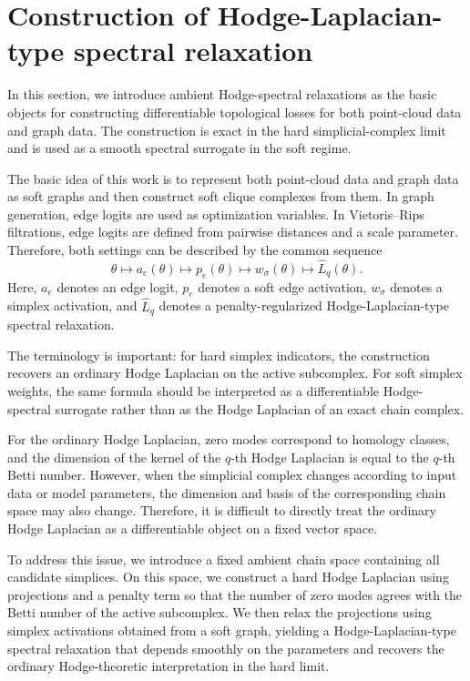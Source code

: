 \documentclass[pdflatex,sn-mathphys-ay]{sn-jnl}%
\theoremstyle{thmstyleone}%
\theoremstyle{thmstyletwo}%
\theoremstyle{thmstylethree}%
\begin{document}
\section{Construction of Hodge-Laplacian-type spectral relaxation}

In this section, we introduce ambient Hodge-spectral relaxations as the basic objects for constructing differentiable topological losses for both point-cloud data and graph data.
The construction is exact in the hard simplicial-complex limit and is used as a smooth spectral surrogate in the soft regime.

The basic idea of this work is to represent both point-cloud data and graph data as soft graphs and then construct soft clique complexes from them. In graph generation, edge logits are used as optimization variables. In Vietoris--Rips filtrations, edge logits are defined from pairwise distances and a scale parameter. Therefore, both settings can be described by the common sequence
\[
\theta
\longmapsto
a_e(\theta)
\longmapsto
p_e(\theta)
\longmapsto
w_\sigma(\theta)
\longmapsto
\widehat{L}_q(\theta).
\]
Here, \(a_e\) denotes an edge logit, \(p_e\) denotes a soft edge activation, \(w_\sigma\) denotes a simplex activation, and \(\widehat{L}_q\) denotes a penalty-regularized Hodge-Laplacian-type spectral relaxation.

The terminology is important: for hard simplex indicators, the construction recovers an ordinary Hodge Laplacian on the active subcomplex. For soft simplex weights, the same formula should be interpreted as a differentiable Hodge-spectral surrogate rather than as the Hodge Laplacian of an exact chain complex.

For the ordinary Hodge Laplacian, zero modes correspond to homology classes, and the dimension of the kernel of the \(q\)-th Hodge Laplacian is equal to the \(q\)-th Betti number. However, when the simplicial complex changes according to input data or model parameters, the dimension and basis of the corresponding chain space may also change. Therefore, it is difficult to directly treat the ordinary Hodge Laplacian as a differentiable object on a fixed vector space.

To address this issue, we introduce a fixed ambient chain space containing all candidate simplices. On this space, we construct a hard Hodge Laplacian using projections and a penalty term so that the number of zero modes agrees with the Betti number of the active subcomplex. We then relax the projections using simplex activations obtained from a soft graph, yielding a Hodge-Laplacian-type spectral relaxation that depends smoothly on the parameters and recovers the ordinary Hodge-theoretic interpretation in the hard limit.
\end{document}
